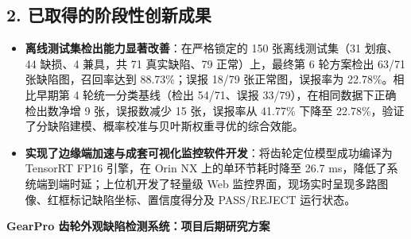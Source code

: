 \subsection*{2. 已取得的阶段性创新成果}
\begin{itemize}
    \item \textbf{离线测试集检出能力显著改善}：在严格锁定的 150 张离线测试集（31 划痕、44 缺损、4 兼具，共 71 真实缺陷、79 正常）上，最终第 6 轮方案检出 63/71 张缺陷图，召回率达到 88.73\%；误报 18/79 张正常图，误报率为 22.78\%。相比早期第 4 轮统一分类基线（检出 54/71、误报 33/79），在相同数据下正确检出数净增 9 张，误报数减少 15 张，误报率从 41.77\% 下降至 22.78\%，验证了分缺陷建模、概率校准与贝叶斯权重寻优的综合效能。
    \item \textbf{实现了边缘端加速与成套可视化监控软件开发}：将齿轮定位模型成功编译为 TensorRT FP16 引擎，在 Orin NX 上的单环节耗时降至 26.7 ms，降低了系统端到端时延；上位机开发了轻量级 Web 监控界面，现场实时呈现多路图像、红框标记缺陷坐标、置信度得分及 PASS/REJECT 运行状态。
\end{itemize}

\newpage


\begin{center}
{\bfseries GearPro 齿轮外观缺陷检测系统：项目后期研究方案\par}
\end{center}




